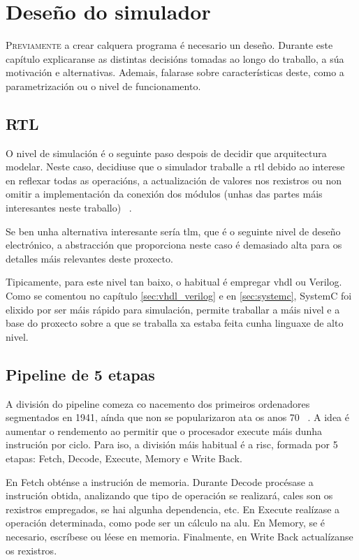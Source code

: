 \chapter{Deseño do simulador}
\label{chap:deseño_simulador}

\lettrine{P}{reviamente} a crear calquera programa é necesario un deseño. Durante este capítulo explicaranse as distintas decisións tomadas ao longo do traballo, a súa motivación e alternativas. Ademais, falarase sobre características deste, como a parametrización ou o nivel de funcionamento.

\section{RTL}\label{sec:rtl}
O nivel de simulación é o seguinte paso despois de decidir que arquitectura modelar. Neste caso, decidiuse que o simulador traballe a \acrshort{rtl} debido ao interese en reflexar todas as operacións, a actualización de valores nos rexistros ou non omitir a implementación da conexión dos módulos (unhas das partes máis interesantes neste traballo) ~\cite{rtl_wikipedia}.

Se ben unha alternativa interesante sería \acrshort{tlm}, que é o seguinte nivel de deseño electrónico, a abstracción que proporciona neste caso é demasiado alta para os detalles máis relevantes deste proxecto.  

Tipicamente, para este nivel tan baixo, o habitual é empregar \acrshort{vhdl} ou Verilog. Como se comentou no capítulo \ref{sec:vhdl_verilog} e en \ref{sec:systemc}, SystemC foi elixido por ser máis rápido para simulación, permite traballar a máis nivel e a base do proxecto sobre a que se traballa xa estaba feita cunha linguaxe de alto nivel.

\section{Pipeline de 5 etapas}\label{sec:pipeline_5etapas}
A división do pipeline comeza co nacemento dos primeiros ordenadores segmentados en 1941, aínda que non se popularizaron ata os anos 70 ~\cite{wiki_segmentacion}. A idea é aumentar o rendemento ao permitir que o procesador execute máis dunha instrución por ciclo. Para iso, a división máis habitual é a \acrfull{risc}, formada por 5 etapas: Fetch, Decode, Execute, Memory e Write Back.

En Fetch obténse a instrución de memoria. Durante Decode procésase a instrución obtida, analizando que tipo de operación se realizará, cales son os rexistros empregados, se hai algunha dependencia, etc. En Execute realízase a operación determinada, como pode ser un cálculo na \acrfull{alu}. En Memory, se é necesario, escríbese ou léese en memoria. Finalmente, en Write Back actualízanse os rexistros.

